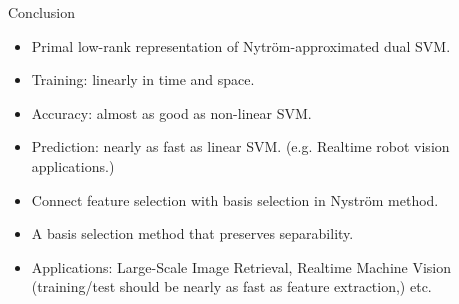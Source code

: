 \documentclass{beamer}
\begin{document}
\begin{frame}{Conclusion}
\begin{itemize}
  \item Primal low-rank representation of Nytr\"om-approximated dual SVM.
  \item [] Training: linearly in time and space.
  \item [] Accuracy: almost as good as non-linear SVM.
  \item [] Prediction: nearly as fast as linear SVM. (e.g. Realtime robot vision applications.)
  \item Connect feature selection with basis selection in Nystr\"om method. 
  \item [] A basis selection method that preserves separability.
  \item Applications: Large-Scale Image Retrieval, Realtime Machine Vision (training/test should be nearly as fast as feature extraction,) etc.
\end{itemize}
\end{frame}
\end{document}
